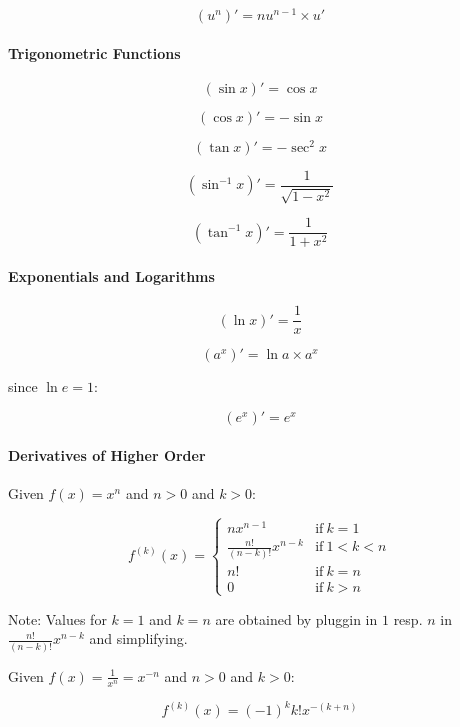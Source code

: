 \documentclass[../main.tex]{subfiles}
\begin{document}
$$
  (u^n)' = nu^{n-1}\times u'
$$

\paragraph{Trigonometric Functions}

$$
  (\sin{x})'=\cos{x}
$$

$$
  (\cos{x})'=-\sin{x}
$$

$$
  (\tan{x})'=-\sec^2{x}
$$

$$
  (\sin^{-1}{x})'=\frac{1}{\sqrt{1-x^2}}
$$

$$
  (\tan^{-1}{x})'=\frac{1}{1+x^2}
$$

\paragraph{Exponentials and Logarithms}

$$
  (\ln{x})'=\frac{1}{x}
$$

$$
  (a^x)'=\ln{a}\times a^x
$$

since $\ln{e}=1$:

$$
  (e^x)'=e^x
$$

\paragraph{Derivatives of Higher Order}

Given $f(x)=x^n$ and $n>0$ and $k>0$:

$$
  f^{(k)}(x)=
  \begin{cases}
    nx^{n-1} & \text{if}\ k=1\\
    \frac{n!}{(n-k)!}x^{n-k} & \text{if}\ 1<k<n\\
    n! & \text{if}\ k=n\\
    0 & \text{if}\ k > n
  \end{cases}
$$

Note: Values for $k=1$ and $k=n$ are obtained by pluggin in $1$ resp.
$n$ in $\frac{n!}{(n-k)!}x^{n-k}$ and simplifying.

Given $f(x)=\frac{1}{x^n}=x^{-n}$ and $n>0$ and $k>0$:

$$
f^{(k)}(x)=(-1)^kk!x^{-(k+n)}
$$
\end{document}
